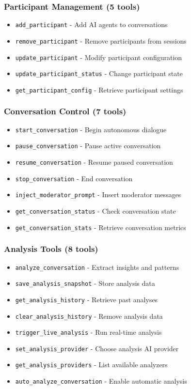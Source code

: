 \documentclass[11pt,letterpaper]{article}
\begin{document}
\subsubsection{Participant Management (5 tools)}
\begin{itemize}
    \item \texttt{add\_participant} - Add AI agents to conversations
    \item \texttt{remove\_participant} - Remove participants from sessions
    \item \texttt{update\_participant} - Modify participant configuration
    \item \texttt{update\_participant\_status} - Change participant state
    \item \texttt{get\_participant\_config} - Retrieve participant settings
\end{itemize}

\subsubsection{Conversation Control (7 tools)}
\begin{itemize}
    \item \texttt{start\_conversation} - Begin autonomous dialogue
    \item \texttt{pause\_conversation} - Pause active conversation
    \item \texttt{resume\_conversation} - Resume paused conversation
    \item \texttt{stop\_conversation} - End conversation
    \item \texttt{inject\_moderator\_prompt} - Insert moderator messages
    \item \texttt{get\_conversation\_status} - Check conversation state
    \item \texttt{get\_conversation\_stats} - Retrieve conversation metrics
\end{itemize}

\subsubsection{Analysis Tools (8 tools)}
\begin{itemize}
    \item \texttt{analyze\_conversation} - Extract insights and patterns
    \item \texttt{save\_analysis\_snapshot} - Store analysis data
    \item \texttt{get\_analysis\_history} - Retrieve past analyses
    \item \texttt{clear\_analysis\_history} - Remove analysis data
    \item \texttt{trigger\_live\_analysis} - Run real-time analysis
    \item \texttt{set\_analysis\_provider} - Choose analysis AI provider
    \item \texttt{get\_analysis\_providers} - List available analyzers
    \item \texttt{auto\_analyze\_conversation} - Enable automatic analysis
\end{itemize}
\end{document}
